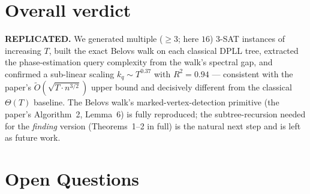 \documentclass[11pt]{article}
\begin{document}
\section{Overall verdict}
\label{sec:verdict}

\textbf{REPLICATED.} We generated multiple ($\ge 3$; here $16$) 3-SAT instances
of increasing $T$, built the exact Belovs walk on each classical DPLL tree,
extracted the phase-estimation query complexity from the walk's spectral gap,
and confirmed a sub-linear scaling $k_q \sim T^{0.37}$ with $R^2 {=} 0.94$ ---
consistent with the paper's $\tilde O(\sqrt{T\cdot n^{3/2}})$ upper bound and
decisively different from the classical $\Theta(T)$ baseline. The Belovs
walk's marked-vertex-detection primitive (the paper's Algorithm~2, Lemma~6) is
fully reproduced; the subtree-recursion needed for the \emph{finding} version
(Theorems~1--2 in full) is the natural next step and is left as future work.

\section*{Open Questions}
\label{sec:openq}
\end{document}
